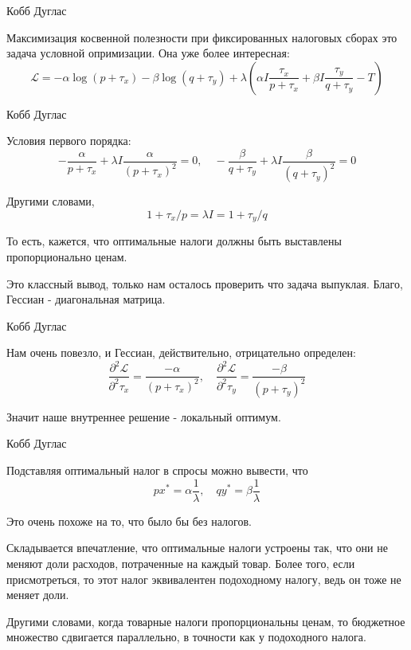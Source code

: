 \documentclass{beamer}
\begin{document}
\begin{frame}{Кобб Дуглас}

Максимизация косвенной полезности при фиксированных налоговых сборах это задача условной опримизации. Она уже более интересная:
$$\mathcal{L} = - \alpha \log(p + \tau_x) - \beta \log (q + \tau_y) + \lambda (\alpha I \frac{\tau_x}{p+\tau_x} + \beta I \frac{\tau_y}{q+\tau_y} - T)$$

\end{frame}

\begin{frame}{Кобб Дуглас}

Условия первого порядка:
$$ - \frac{\alpha}{p + \tau_x} + \lambda I \frac{\alpha}{(p + \tau_x)^2} = 0, \quad - \frac{\beta}{q + \tau_y} + \lambda I \frac{\beta}{(q + \tau_y)^2} = 0$$

Другими словами,
$$1 + \tau_x / p = \lambda I = 1 + \tau_y / q$$

То есть, кажется, что оптимальные налоги должны быть выставлены пропорционально ценам. 

Это классный вывод, только нам осталось проверить что задача выпуклая. Благо, Гессиан - диагональная матрица.

\end{frame}

\begin{frame}{Кобб Дуглас}

Нам очень повезло, и Гессиан, действительно, отрицательно определен:
$$ \frac{\partial^2 \mathcal{L}}{\partial^2 \tau_x} = \frac{-\alpha}{(p+\tau_x)^2}, \quad \frac{\partial^2 \mathcal{L}}{\partial^2 \tau_y} = \frac{-\beta}{(p+\tau_y)^2}$$

Значит наше внутреннее решение - локальный оптимум.

\end{frame}

\begin{frame}{Кобб Дуглас}

Подставляя оптимальный налог в спросы можно вывести, что
$$ p x^{\ast} = \alpha \frac{1}{\lambda}, \quad q y^{\ast} = \beta \frac{1}{\lambda}$$

Это очень похоже на то, что было бы без налогов. 

Складывается впечатление, что оптимальные налоги устроены так, что они не меняют доли расходов, потраченные на каждый товар. Более того, если присмотреться, то этот налог эквивалентен подоходному налогу, ведь он тоже не меняет доли. 

Другими словами, когда товарные налоги пропорциональны ценам, то бюджетное множество сдвигается параллельно, в точности как у подоходного налога.

\end{frame}
\end{document}
